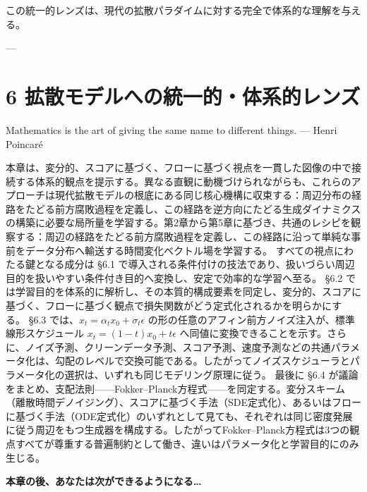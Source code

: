 この統一的レンズは、現代の拡散パラダイムに対する完全で体系的な理解を与える。

---

\section*{6 拡散モデルへの統一的・体系的レンズ}


\begin{propositionbox}[注意]
Mathematics is the art of giving the same name to different things.
— Henri Poincaré
\end{propositionbox}


本章は、変分的、スコアに基づく、フローに基づく視点を一貫した図像の中で接続する体系的観点を提示する。異なる直観に動機づけられながらも、これらのアプローチは現代拡散モデルの根底にある同じ核心機構に収束する：周辺分布の経路をたどる前方腐敗過程を定義し、この経路を逆方向にたどる生成ダイナミクスの構築に必要な局所量を学習する。第2章から第5章に基づき、共通のレシピを観察する：周辺の経路をたどる前方腐敗過程を定義し、この経路に沿って単純な事前をデータ分布へ輸送する時間変化ベクトル場を学習する。
すべての視点にわたる鍵となる成分は §6.1 で導入される条件付けの技法であり、扱いづらい周辺目的を扱いやすい条件付き目的へ変換し、安定で効率的な学習へ至る。
§6.2 では学習目的を体系的に解析し、その本質的構成要素を同定し、変分的、スコアに基づく、フローに基づく観点で損失関数がどう定式化されるかを明らかにする。
§6.3 では、$x_t=\alpha_t x_0+\sigma_t\epsilon$ の形の任意のアフィン前方ノイズ注入が、標準線形スケジュール $x_t=(1-t)x_0+t\epsilon$ へ同値に変換できることを示す。さらに、ノイズ予測、クリーンデータ予測、スコア予測、速度予測などの共通パラメータ化は、勾配のレベルで交換可能である。したがってノイズスケジューラとパラメータ化の選択は、いずれも同じモデリング原理に従う。
最後に §6.4 が議論をまとめ、支配法則——Fokker–Planck方程式——を同定する。変分スキーム（離散時間デノイジング）、スコアに基づく手法（SDE定式化）、あるいはフローに基づく手法（ODE定式化）のいずれとして見ても、それぞれは同じ密度発展に従う周辺をもつ生成器を構成する。したがってFokker–Planck方程式は3つの観点すべてが尊重する普遍制約として働き、違いはパラメータ化と学習目的にのみ生じる。

\textbf{本章の後、あなたは次ができるようになる…}

